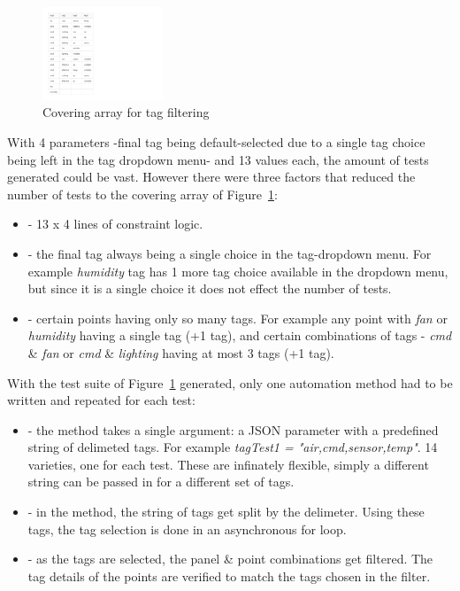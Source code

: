 \documentclass[conference]{IEEEtran}
\begin{document}
	\begin{figure}[!hb]
		\centering
		\includegraphics[width=0.32\textwidth,]{tagFilterCoveringArray.pdf}
		\caption{Covering array for tag filtering}
		\label{fig:tagFilterCoveringArray}
	\end{figure}


	With 4 parameters -final tag being default-selected due to a single tag choice being left in the tag dropdown menu- and 13 values each, the amount of tests generated could be vast. 
	However there were three factors that reduced the number of tests to the covering array of Figure~\ref{fig:tagFilterCoveringArray}:
	
	\begin{itemize}
		\item [] - 13 x 4 lines of constraint logic.
		\item [] - the final tag always being a single choice in the tag-dropdown menu. For example \textit{humidity} tag has 1 more tag choice available in the dropdown menu, but since it is a single choice it does not effect the number of tests.
		\item [] - certain points having only so many tags. For example any point with \textit{fan} or \textit{humidity} having a single tag (+1 tag), and certain combinations of tags - \textit{cmd} \& \textit{fan} or \textit{cmd} \& \textit{lighting} having at most 3 tags (+1 tag).
	\end{itemize}

	With the test suite of Figure~\ref{fig:tagFilterCoveringArray} generated, only one automation method had to be written and repeated for each test:
	
	\begin{itemize}
		\item [] - the method takes a single argument: a JSON parameter with a predefined string of delimeted tags. For example \textit{tagTest1 = "air,cmd,sensor,temp"}. 14 varieties, one for each test. These are infinately flexible, simply a different string can be passed in for a different set of tags.
		\item [] - in the method, the string of tags get split by the delimeter. Using these tags, the tag selection is done in an asynchronous for loop. 
		\item [] - as the tags are selected, the panel \& point combinations get filtered. The tag details of the points are verified to match the tags chosen in the filter.
	\end{itemize}
\end{document}
